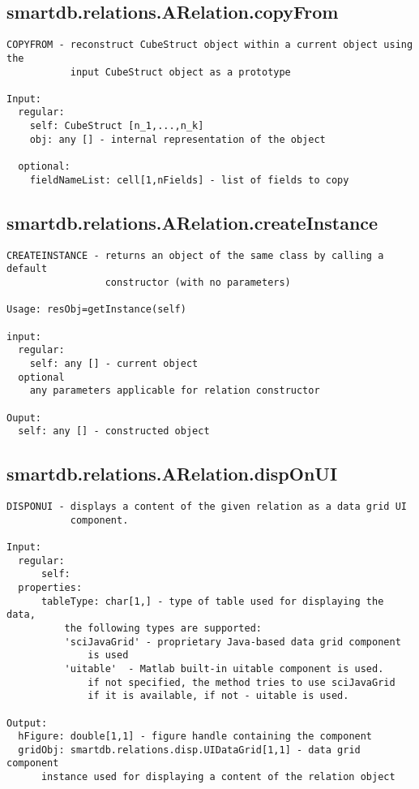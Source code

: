 \subsection{\texorpdfstring{smartdb.relations.ARelation.copyFrom}{copyFrom}}\label{method:smartdb.relations.ARelation.copyFrom}
\begin{verbatim}
COPYFROM - reconstruct CubeStruct object within a current object using the
           input CubeStruct object as a prototype

Input:
  regular:
    self: CubeStruct [n_1,...,n_k]
    obj: any [] - internal representation of the object

  optional:
    fieldNameList: cell[1,nFields] - list of fields to copy
\end{verbatim}
\subsection{\texorpdfstring{smartdb.relations.ARelation.createInstance}{createInstance}}\label{method:smartdb.relations.ARelation.createInstance}
\begin{verbatim}
CREATEINSTANCE - returns an object of the same class by calling a default
                 constructor (with no parameters)

Usage: resObj=getInstance(self)

input:
  regular:
    self: any [] - current object
  optional
    any parameters applicable for relation constructor

Ouput:
  self: any [] - constructed object
\end{verbatim}
\subsection{\texorpdfstring{smartdb.relations.ARelation.dispOnUI}{dispOnUI}}\label{method:smartdb.relations.ARelation.dispOnUI}
\begin{verbatim}
DISPONUI - displays a content of the given relation as a data grid UI
           component.

Input:
  regular:
      self:
  properties:
      tableType: char[1,] - type of table used for displaying the data,
          the following types are supported:
          'sciJavaGrid' - proprietary Java-based data grid component
              is used
          'uitable'  - Matlab built-in uitable component is used.
              if not specified, the method tries to use sciJavaGrid
              if it is available, if not - uitable is used.

Output:
  hFigure: double[1,1] - figure handle containing the component
  gridObj: smartdb.relations.disp.UIDataGrid[1,1] - data grid component
      instance used for displaying a content of the relation object
\end{verbatim}
